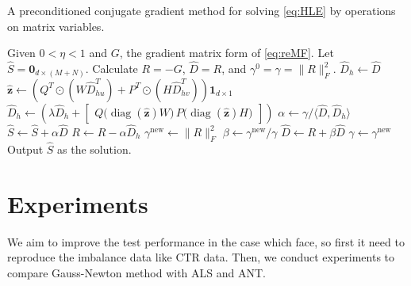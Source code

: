 \documentclass[11pt,twoside]{article}
\newcommand{\bsym}[1]{\ensuremath{\boldsymbol{#1}}}
\newcommand{\bz}{\ensuremath{\bsym{z}}}
\DeclareMathOperator*{\diag}{diag}
\begin{document}
\begin{algorithm}[t]
    \caption{A preconditioned conjugate gradient method for solving \eqref{eq:HLE} by operations on matrix variables.}
    \label{alg:Pcg}
    \begin{algorithmic}[1]
        \State Given $0<\eta<1$ and $G$, the gradient matrix form of \eqref{eq:reMF}. Let $\hat{S}=\bsym{0}_{d\times (M+N)}$.
        \State Calculate $R = -G$, $\hat{D}=R$, and $\gamma^0=\gamma=\|R\|_F^2$.
            \State $\hat{D}_h \gets \hat{D} $
            \State $\hat{\bz}\gets \left( {Q^T}\odot{(W\hat{D}_{hu}^T)}+{P^T}\odot{(H\hat{D}_{hv}^T)} \right) \bsym{1}_{d\times 1}$
            \State $\hat{D}_h \gets \left(\lambda \hat{D}_h + \begin{bmatrix} Q \bigl(\diag(\hat{\bz}) W \bigr) \, P \bigl ( \diag(\hat{\bz}) H \bigr) \end{bmatrix}\right) $
            \State $\alpha \gets \gamma / \langle \hat{D},\hat{D}_h \rangle$
            \State $\hat{S} \gets\hat{S}+\alpha \hat{D}$
            \State $R \gets R-\alpha \hat{D}_h$
            \State $\gamma^{\text{new}} \gets \|R\|_F^2$
            \State $\beta \gets \gamma^{\text{new}}/\gamma$
            \State $\hat{D} \gets R+\beta \hat{D}$
            \State $\gamma \gets \gamma^{\text{new}}$
        \EndWhile
        \State Output $\hat{S}$ as the solution.
    \end{algorithmic}
\end{algorithm}

\section{Experiments}
We aim to improve the test performance in the case which \cite{WSC18a} face, so first it need to reproduce the imbalance data like CTR data. Then, we conduct experiments to compare Gauss-Newton method with ALS and ANT.
\end{document}
